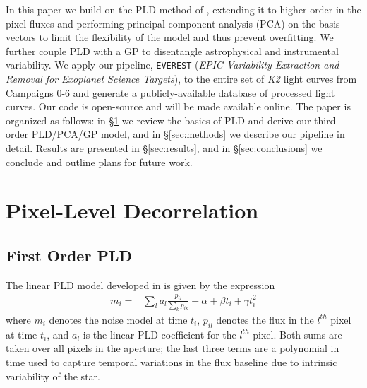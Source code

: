 \documentclass[]{emulateapj}
\begin{document}
In this paper we build on the PLD method of \cite{DEM15}, extending it to higher order
in the pixel fluxes and performing principal component analysis (PCA) on the basis
vectors to limit the flexibility of the model and thus prevent overfitting. We further 
couple PLD with a GP to 
disentangle astrophysical and instrumental variability. 
%
%
%
We apply our pipeline, \texttt{EVEREST}
(\emph{EPIC Variability Extraction and Removal for
Exoplanet Science Targets}), to the entire set of \emph{K2} light curves from Campaigns 0-6 and generate a 
publicly-available database of processed light curves. Our code is open-source and will be made
available online.
%
%
The paper is organized as follows: in \S\ref{sec:pld} we review the basics of PLD and
derive our third-order PLD/PCA/GP model, and in \S\ref{sec:methods} we describe our pipeline
in detail. Results are presented in \S\ref{sec:results}, and in \S\ref{sec:conclusions}
we conclude and outline plans for future work.

\section{Pixel-Level Decorrelation}
\label{sec:pld}
\subsection{First Order PLD}
\label{sec:firstorder}
The linear PLD model developed in \cite{DEM15} is given by the expression
\begin{align}
\label{eq:demingmodel}
m_i = &\sum\limits_{l}a_l\frac{p_{il}}{\sum\limits_{k}p_{ik}} + \alpha + \beta t_i + \gamma t_i^2
\end{align}
where $m_i$ denotes the noise model at time $t_i$,
$p_{il}$ denotes the flux in the $l^{th}$ pixel at time $t_i$, and $a_l$ is
the linear PLD coefficient for the $l^{th}$ pixel. Both sums are taken over
all pixels in the aperture; the last three terms are a polynomial in time used
to capture temporal variations in the flux baseline due to intrinsic variability
of the star.
\end{document}
